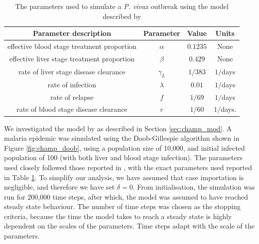 \begin{table}[htbp]
    \caption{
        The parameters used to simulate a \textit{P. vivax} outbreak using
        the model described by \cite{champagne_using_2022}
    }
    \label{tab:synth_params}
    \centering
    \begin{tabular}{c | c | c | c}
        Parameter description                      & Parameter
                                                   & Value      & Units     \\
        \hline
        effective blood stage treatment proportion & $\alpha$
                                                   & $0.1235$      & None      \\
        effective liver stage treatment proportion & $\beta $
                                                   & $0.429$      & None      \\
        rate of liver stage disease clearance      & $\gamma_L$
                                                   & $1 / 383$  & $1/$days  \\
        rate of infection                          & $\lambda$
                                                   & $0.01$     & $1/$days  \\
        rate of relapse                            & $f$
                                                   & $1/69$     & $1/$days  \\
        rate of blood stage disease clearance      & $r$
                                                   & $1/60$     & $1/$days. \\
    \end{tabular}
\end{table}

We investigated the model by \cite{champagne_using_2022} as described in 
Section
\ref{sec:champ_mod}. A malaria epidemic was simulated using the Doob-Gillespie
algorithm shown in Figure \ref{fig:champ_doob}, using a population
size of 10,000, and initial infected population of 100 (with both liver and blood
stage infection). The parameters used closely followed those reported in
\cite{champagne_using_2022}, with the exact parameters used reported in Table
\ref{tab:synth_params}. To simplify our analysis, we have assumed that case
importation is negligible, and therefore we have set $\delta = 0.$
From initialisation, the simulation was run for 200,000 time steps, 
after which, the model was
assumed to have reached steady state behaviour. 
The number of time steps was chosen as the stopping criteria,
because the time the model takes to reach a steady state is highly dependent 
on the scales of the parameters. Time steps adapt with the scale of
the parameters.

